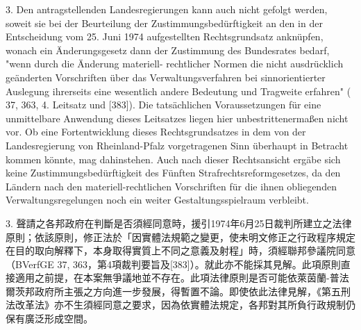 \documentclass[12pt]{article}
\begin{document}
\syncleft
\begin{sourcepara}
3. Den antragstellenden Landesregierungen kann auch nicht gefolgt werden, soweit sie bei der Beurteilung der Zustimmungsbedürftigkeit an den in der Entscheidung vom 25. Juni 1974 aufgestellten Rechtsgrundsatz anknüpfen, wonach ein Änderungsgesetz dann der Zustimmung des Bundesrates bedarf, "wenn durch die Änderung materiell- rechtlicher Normen die nicht ausdrücklich geänderten Vorschriften über das Verwaltungsverfahren bei sinnorientierter Auslegung ihrerseits eine wesentlich andere Bedeutung und Tragweite erfahren" (\abbrBVerfGE{} 37, 363, 4. Leitsatz und [383]). Die tatsächlichen Voraussetzungen für eine unmittelbare Anwendung dieses Leitsatzes liegen hier unbestrittenermaßen nicht vor. Ob eine Fortentwicklung dieses Rechtsgrundsatzes in dem von der Landesregierung von Rheinland-Pfalz vorgetragenen Sinn überhaupt in Betracht kommen könnte, mag dahinstehen. Auch nach dieser Rechtsansicht ergäbe sich keine Zustimmungsbedürftigkeit des Fünften Strafrechtsreformgesetzes, da den Ländern nach den materiell-rechtlichen Vorschriften für die ihnen obliegenden Verwaltungsregelungen noch ein weiter Gestaltungsspielraum verbleibt.
\end{sourcepara}
\begin{transpara}
3. 聲請之各邦政府在判斷是否須經同意時，援引1974年6月25日裁判所建立之法律原則；依該原則，修正法於「因實體法規範之變更，使未明文修正之行政程序規定在目的取向解釋下，本身取得實質上不同之意義及射程」時，須經聯邦參議院同意（BVerfGE 37, 363，第4項裁判要旨及[383]）。就此亦不能採其見解。此項原則直接適用之前提，在本案無爭議地並不存在。此項法律原則是否可能依萊茵蘭-普法爾茨邦政府所主張之方向進一步發展，得暫置不論。即使依此法律見解，《第五刑法改革法》亦不生須經同意之要求，因為依實體法規定，各邦對其所負行政規制仍保有廣泛形成空間。
\end{transpara}
\end{document}
